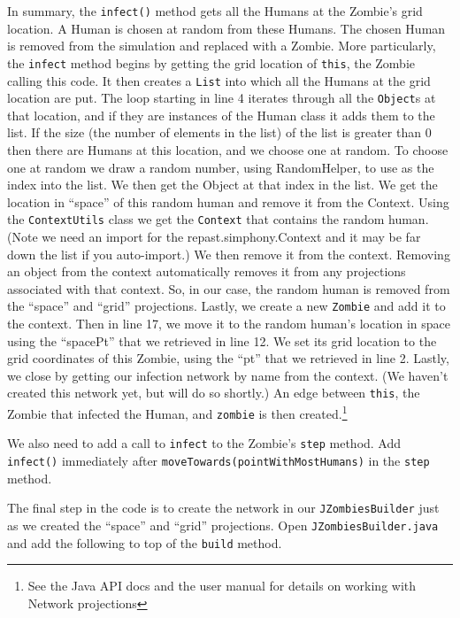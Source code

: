 \documentclass[11pt]{amsart}
\begin{document}
In summary, the \texttt{infect()} method gets all the Humans at the Zombie's grid location. A Human is chosen at random from these Humans. The chosen Human is removed from the simulation and replaced with a Zombie. More particularly, the \texttt{infect} method begins by getting the grid location of \texttt{this}, the Zombie calling this code. It then creates a \texttt{List} into which all the Humans at the grid location are put. The loop starting in line 4 iterates through all the \texttt{Object}s at that location, and if they are instances of the Human class it adds them to the list. If the size (the number of elements in the list) of the list is greater than 0 then there are Humans at this location, and we choose one at random. To choose one at random we draw a random number, using RandomHelper, to use as the index into the list. We then get the Object at that index in the list. We get the location in ``space'' of this random human and remove it from the Context. Using the \texttt{ContextUtils} class we get the \texttt{Context} that contains the random human. (Note we need an import for the repast.simphony.Context and it may be far down the list if you auto-import.) We then remove it from the context. Removing an object from the context automatically removes it from any projections associated with that context. So, in our case, the random human is removed from the ``space'' and ``grid'' projections. Lastly, we create a new \texttt{Zombie} and add it to the context. Then in line 17, we move it to the random human's location in space using the ``spacePt'' that we retrieved in line 12. We set its grid location to the grid coordinates of this Zombie, using the ``pt'' that we retrieved in line 2. Lastly, we close by getting our infection network by name from the context. (We haven't created this network yet, but will do so shortly.) An edge between \texttt{this}, the Zombie that infected the Human, and \texttt{zombie} is then created.\footnote{See the Java API docs and the user manual for details on working with Network projections}

We also need to add a call to \texttt{infect} to the Zombie's \texttt{step} method. Add \texttt{infect()} immediately after \texttt{moveTowards(pointWithMostHumans)} in the \texttt{step} method.

The final step in the code is to create the network in our \texttt{JZombiesBuilder} just as we created the ``space'' and ``grid'' projections. Open \texttt{JZombiesBuilder.java} and add the following to top of the \texttt{build} method. 
\end{document}
